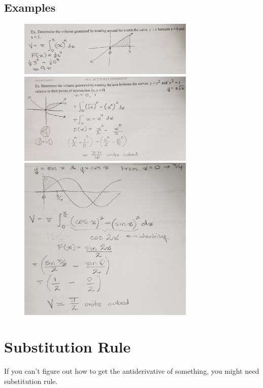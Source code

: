 \documentclass[a4paper,12pt]{article}
\begin{document}
\subsection{Examples}
\begin{figure}[H]
    \centering
    \includegraphics[width=0.75\textwidth]{revex1}
    \includegraphics[width=0.75\textwidth]{revex2}
    \includegraphics[width=0.75\textwidth]{revex3}
\end{figure}

\section{Substitution Rule}
If you can't figure out how to get the antiderivative of something, you might need substitution rule.
\end{document}
